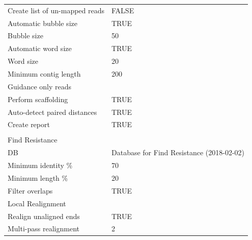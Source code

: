 \begin{longtable}{ll}
Create list of un-mapped reads               & FALSE                                          \\
Automatic bubble size                        & TRUE                                           \\
Bubble size                                  & 50                                             \\
Automatic word size                          & TRUE                                           \\
Word size                                    & 20                                             \\
Minimum contig length                        & 200                                            \\
Guidance only reads                          &                                                \\
Perform scaffolding                          & TRUE                                           \\
Auto-detect paired distances                 & TRUE                                           \\
Create report                                & TRUE                                           \\
                                             &                                                \\
\multicolumn{2}{l}{Find Resistance}                                                           \\
DB                                           & Database for Find Resistance (2018-02-02)      \\
Minimum identity \%                          & 70                                             \\
Minimum length \%                            & 20                                             \\
Filter overlaps                              & TRUE                                           \\
Local Realignment                            &                                                \\
Realign unaligned ends                       & TRUE                                           \\
Multi-pass realignment                       & 2                                              \\

\end{longtable}
